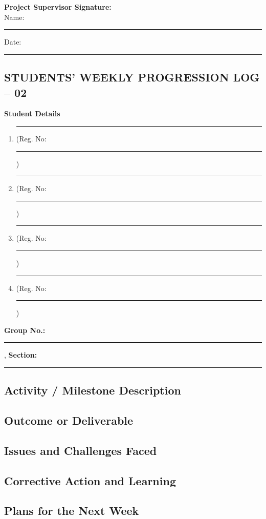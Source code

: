 \documentclass[a4paper]{article}
\begin{document}
\vfill
\textbf{Project Supervisor Signature:}\\[1em]
Name: \rule{6cm}{0.4pt} \hfill Date: \rule{4cm}{0.4pt}


\newpage
\begin{center}
\section*{STUDENTS' WEEKLY PROGRESSION LOG -- 02}
\end{center}
{\Large\textbf{Student Details}}\\[0.1em]
\begin{enumerate}[itemsep=0em]
\item \rule{8cm}{0.4pt} (Reg. No:\rule{2cm}{0.4pt})
\item \rule{8cm}{0.4pt} (Reg. No:\rule{2cm}{0.4pt})
\item \rule{8cm}{0.4pt} (Reg. No:\rule{2cm}{0.4pt})
\item \rule{8cm}{0.4pt} (Reg. No:\rule{2cm}{0.4pt})
\end{enumerate}
\textbf{Group No.:} \rule{4cm}{0.4pt}, \textbf{Section:} \rule{3.5cm}{0.4pt}

				 
\subsection*{Activity / Milestone Description}
\framebox[\textwidth][c]{\rule{0pt}{4cm}}

\subsection*{Outcome or Deliverable}
\framebox[\textwidth][c]{\rule{0pt}{4cm}}


\subsection*{Issues and Challenges Faced}
\framebox[\textwidth][c]{\rule{0pt}{4cm}}


\subsection*{Corrective Action and Learning}
\framebox[\textwidth][c]{\rule{0pt}{4cm}}


\subsection*{Plans for the Next Week}
\framebox[\textwidth][c]{\rule{0pt}{4cm}}
\end{document}
